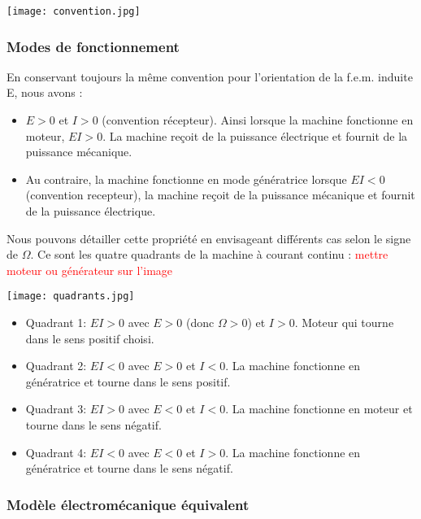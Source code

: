 \documentclass{article}
\begin{document}
\begin{center}
    \texttt{[image: convention.jpg]}
\end{center}


\subsubsection{Modes de fonctionnement}

En conservant toujours la même convention pour l'orientation de la f.e.m. induite E, nous avons :

\begin{itemize}
    \item $E > 0$ et $I>0$ (convention récepteur). Ainsi lorsque la machine fonctionne en moteur, $EI>0$. La machine reçoit de la puissance électrique et fournit de la puissance mécanique.
    \item Au contraire, la machine fonctionne en mode génératrice lorsque $EI<0$ (convention recepteur), la machine reçoit de la puissance mécanique et fournit de la puissance électrique.
\end{itemize}

Nous pouvons détailler cette propriété en envisageant différents cas selon le signe de $\Omega$. Ce sont les quatre quadrants de la machine à courant continu : \textcolor{red}{mettre moteur ou générateur sur l'image}


\begin{center}
    \texttt{[image: quadrants.jpg]}
\end{center}


\begin{itemize}
    \item Quadrant 1: $EI>0$ avec $E>0$ (donc $\Omega >0$) et $I>0$. Moteur qui tourne dans le sens positif choisi.
    \item Quadrant 2: $EI<0$ avec $E>0$ et $I<0$. La machine fonctionne en génératrice et tourne dans le sens positif.
    \item Quadrant 3: $EI>0$ avec $E<0$ et $I<0$. La machine fonctionne en moteur et tourne dans le sens négatif.
    \item Quadrant 4: $EI<0$ avec $E<0$ et $I>0$. La machine fonctionne en génératrice et tourne dans le sens négatif.
\end{itemize}

\subsubsection{Modèle électromécanique équivalent}
\end{document}
